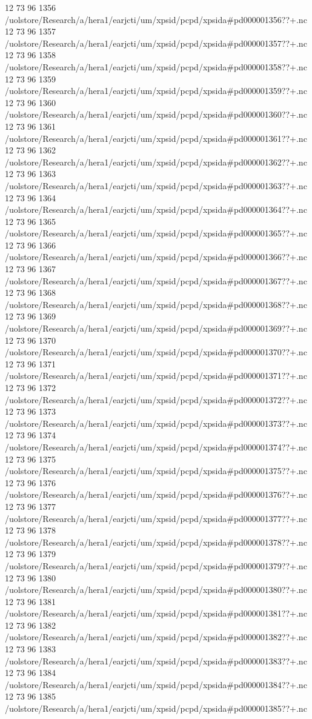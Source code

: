 12 73 96
1356
/uolstore/Research/a/hera1/earjcti/um/xpsid/pcpd/xpsida#pd000001356??+.nc
12 73 96
1357
/uolstore/Research/a/hera1/earjcti/um/xpsid/pcpd/xpsida#pd000001357??+.nc
12 73 96
1358
/uolstore/Research/a/hera1/earjcti/um/xpsid/pcpd/xpsida#pd000001358??+.nc
12 73 96
1359
/uolstore/Research/a/hera1/earjcti/um/xpsid/pcpd/xpsida#pd000001359??+.nc
12 73 96
1360
/uolstore/Research/a/hera1/earjcti/um/xpsid/pcpd/xpsida#pd000001360??+.nc
12 73 96
1361
/uolstore/Research/a/hera1/earjcti/um/xpsid/pcpd/xpsida#pd000001361??+.nc
12 73 96
1362
/uolstore/Research/a/hera1/earjcti/um/xpsid/pcpd/xpsida#pd000001362??+.nc
12 73 96
1363
/uolstore/Research/a/hera1/earjcti/um/xpsid/pcpd/xpsida#pd000001363??+.nc
12 73 96
1364
/uolstore/Research/a/hera1/earjcti/um/xpsid/pcpd/xpsida#pd000001364??+.nc
12 73 96
1365
/uolstore/Research/a/hera1/earjcti/um/xpsid/pcpd/xpsida#pd000001365??+.nc
12 73 96
1366
/uolstore/Research/a/hera1/earjcti/um/xpsid/pcpd/xpsida#pd000001366??+.nc
12 73 96
1367
/uolstore/Research/a/hera1/earjcti/um/xpsid/pcpd/xpsida#pd000001367??+.nc
12 73 96
1368
/uolstore/Research/a/hera1/earjcti/um/xpsid/pcpd/xpsida#pd000001368??+.nc
12 73 96
1369
/uolstore/Research/a/hera1/earjcti/um/xpsid/pcpd/xpsida#pd000001369??+.nc
12 73 96
1370
/uolstore/Research/a/hera1/earjcti/um/xpsid/pcpd/xpsida#pd000001370??+.nc
12 73 96
1371
/uolstore/Research/a/hera1/earjcti/um/xpsid/pcpd/xpsida#pd000001371??+.nc
12 73 96
1372
/uolstore/Research/a/hera1/earjcti/um/xpsid/pcpd/xpsida#pd000001372??+.nc
12 73 96
1373
/uolstore/Research/a/hera1/earjcti/um/xpsid/pcpd/xpsida#pd000001373??+.nc
12 73 96
1374
/uolstore/Research/a/hera1/earjcti/um/xpsid/pcpd/xpsida#pd000001374??+.nc
12 73 96
1375
/uolstore/Research/a/hera1/earjcti/um/xpsid/pcpd/xpsida#pd000001375??+.nc
12 73 96
1376
/uolstore/Research/a/hera1/earjcti/um/xpsid/pcpd/xpsida#pd000001376??+.nc
12 73 96
1377
/uolstore/Research/a/hera1/earjcti/um/xpsid/pcpd/xpsida#pd000001377??+.nc
12 73 96
1378
/uolstore/Research/a/hera1/earjcti/um/xpsid/pcpd/xpsida#pd000001378??+.nc
12 73 96
1379
/uolstore/Research/a/hera1/earjcti/um/xpsid/pcpd/xpsida#pd000001379??+.nc
12 73 96
1380
/uolstore/Research/a/hera1/earjcti/um/xpsid/pcpd/xpsida#pd000001380??+.nc
12 73 96
1381
/uolstore/Research/a/hera1/earjcti/um/xpsid/pcpd/xpsida#pd000001381??+.nc
12 73 96
1382
/uolstore/Research/a/hera1/earjcti/um/xpsid/pcpd/xpsida#pd000001382??+.nc
12 73 96
1383
/uolstore/Research/a/hera1/earjcti/um/xpsid/pcpd/xpsida#pd000001383??+.nc
12 73 96
1384
/uolstore/Research/a/hera1/earjcti/um/xpsid/pcpd/xpsida#pd000001384??+.nc
12 73 96
1385
/uolstore/Research/a/hera1/earjcti/um/xpsid/pcpd/xpsida#pd000001385??+.nc
